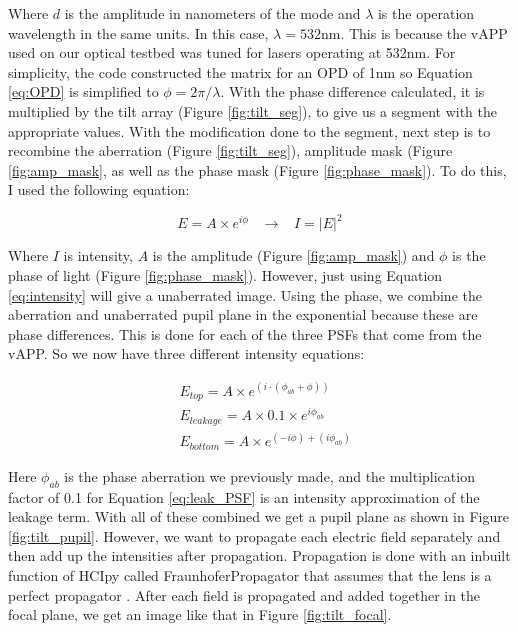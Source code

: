 Where $d$ is the amplitude in nanometers of the mode and $\lambda$ is the operation wavelength in the same units.  In this case, $\lambda = 532$nm. 
This is because the vAPP used on our optical testbed was tuned for lasers operating at 532nm.  For simplicity, the
code constructed the matrix for an OPD of 1nm so Equation \ref{eq:OPD} is simplified to $\phi = 2 \pi / \lambda$. 
With the phase difference calculated, it is multiplied by the tilt array (Figure \ref{fig:tilt_seg}), to give us a
segment with the appropriate values.  With the modification done to the segment, next step is to recombine the
aberration (Figure \ref{fig:tilt_seg}), amplitude mask (Figure \ref{fig:amp_mask}, as well as the phase mask (Figure
\ref{fig:phase_mask}).  To do this, I used the following equation:

\begin{equation}
    E = A \times e^{i \phi} \;\;\; \rightarrow \;\;\; I = |E|^2
    \label{eq:intensity}
\end{equation}

Where $I$ is intensity, $A$ is the amplitude (Figure \ref{fig:amp_mask}) and $\phi$ is the phase of light (Figure
\ref{fig:phase_mask}).  However, just using Equation \ref{eq:intensity} will give a unaberrated image.  Using the
phase, we combine the aberration and unaberrated pupil plane in the exponential because these are phase differences. 
This is done for each of the three PSFs that come from the vAPP.  So we now have three different intensity
equations:

\begin{align}
    & E_{top} = A \times e^{(i \cdot (\phi_{ab} + \phi))} \label{eq:top_PSF} \\
    & E_{leakage} = A \times 0.1 \times e^{i \phi_{ab}} \label{eq:leak_PSF} \\
    & E_{bottom} = A \times e^{(-i \phi) + (i \phi_{ab})} \label{eq:bottom_PSF}
\end{align}

Here $\phi_{ab}$ is the phase aberration we previously made, and the multiplication factor of 0.1 for Equation
\ref{eq:leak_PSF} is an intensity approximation of the leakage term.  With all of these combined we get a pupil
plane as shown in Figure \ref{fig:tilt_pupil}.  However, we want to propagate each electric field separately and then add up
the intensities after propagation.  Propagation is done with an inbuilt function of HCIpy called FraunhoferPropagator that assumes that the lens is a perfect propagator \cite{por2018hcipy}.  
After each field is propagated and added together in the focal plane, we get an image like that
in Figure \ref{fig:tilt_focal}.

